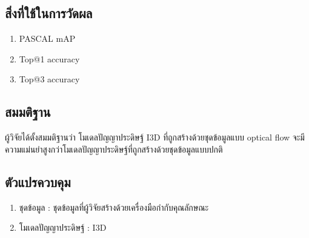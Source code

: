 \subsection*{สิ่งที่ใช้ในการวัดผล}
	\begin{enumerate}
		\setlength\itemsep{-0.25em}
		\item PASCAL mAP
		\item Top@1 accuracy
		\item Top@3 accuracy
	\end{enumerate}
\subsection*{สมมติฐาน}
ผู้วิจัยได้ตั้งสมมติฐานว่า โมเดลปัญญาประดิษฐ์ I3D ที่ถูกสร้างด้วยชุดข้อมูลแบบ optical flow จะมีความแม่นยำสูงกว่าโมเดลปัญญาประดิษฐ์ที่ถูกสร้างด้วยชุดข้อมูลแบบปกติ
\subsection*{ตัวแปรควบคุม}
	\begin{enumerate}
		\setlength\itemsep{-0.25em}
		\item ชุดข้อมูล : ชุดข้อมูลที่ผู้วิจัยสร้างด้วยเครื่องมือกำกับคุณลักษณะ
		\item โมเดลปัญญาประดิษฐ์ : I3D
	\end{enumerate}
